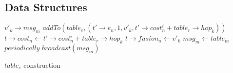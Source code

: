 \subsection{Data Structures}

\begin{algorithm}
\begin{algorithmic}[1]
\REQUIRE \(v'_k\rightarrow msg_m\)
			\STATE \(addTo(table_e, (t'\rightarrow e_n, 1, v'_k, t'\rightarrow cost_n^i+table_r\rightarrow hop_k))\)
		\ENDIF
					\STATE \(t\rightarrow cost_n \gets t'\rightarrow cost_n^i+table_r\rightarrow hop_k\)
					\STATE \(t\rightarrow fusion_n \gets v'_k\)
				\ENDIF
			\ENDIF
		\ENDFOR
	\ENDFOR
		\STATE \(msg_m \gets table_m\)
		\STATE \(periodically\_broadcast(msg_m)\)
	\ENDIF
\end{algorithmic}
\caption{\(table_e\) construction}
\label{algo:table_e}
\end{algorithm}

